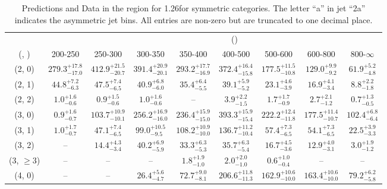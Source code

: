 \begin{table}[h!]
\tiny
\centering
\caption{Predictions and Data in the \mj region for 1.26\ifb for symmetric categories. The letter ``a'' in jet \eg ``2a''  indicates the asymmetric jet bins. All entries are non-zero but are truncated to one decimal place.\label{tab:prednodata_comb_mu_sym}}
\begin{tabular}
{ccccccccc}
	\hline\hline
&	& \multicolumn{8}{c}{\scalht (\gev)} \\ 
	 (\njet,  \nb) & 200-250 & 250-300 & 300-350 & 350-400 & 400-500 & 500-600 & 600-800 & 800-$\infty$ \\ [0.8ex] 
\hline
	(2, 0) & $279.3^{+ 17.8 }_{- 17.0 }$ & $412.9^{+ 21.5 }_{- 20.7 }$ & $391.4^{+ 20.9 }_{- 20.1 }$ & $293.2^{+ 17.7 }_{- 16.9 }$ & $372.4^{+ 16.4 }_{- 15.8 }$ & $177.5^{+ 11.5 }_{- 10.8 }$ & $129.0^{+ 9.9 }_{- 9.2 }$ & $61.9^{+ 5.2 }_{- 4.8 }$ \\[0.5ex] 
	(2, 1) & $44.8^{+ 7.2 }_{- 6.3 }$ & $47.5^{+ 7.4 }_{- 6.5 }$ & $40.9^{+ 6.8 }_{- 6.0 }$ & $35.4^{+ 6.4 }_{- 5.5 }$ & $39.1^{+ 5.9 }_{- 5.2 }$ & $23.1^{+ 4.6 }_{- 3.9 }$ & $16.9^{+ 4.1 }_{- 3.4 }$ & $8.8^{+ 2.2 }_{- 1.8 }$ \\[0.5ex] 
	(2, 2) & $1.0^{+ 1.6 }_{- 0.6 }$ & $0.9^{+ 1.5 }_{- 0.6 }$ & $1.0^{+ 1.6 }_{- 0.6 }$ & -- & $3.9^{+ 2.2 }_{- 1.5 }$ & $1.7^{+ 1.7 }_{- 0.9 }$ & $2.7^{+ 2.1 }_{- 1.2 }$ & $0.7^{+ 1.3 }_{- 0.5 }$ \\[0.5ex] 
	(3, 0) & $0.9^{+ 1.6 }_{- 0.7 }$ & $103.7^{+ 10.9 }_{- 10.1 }$ & $256.2^{+ 16.9 }_{- 16.0 }$ & $236.4^{+ 15.9 }_{- 15.0 }$ & $393.3^{+ 15.9 }_{- 15.4 }$ & $222.2^{+ 12.4 }_{- 11.8 }$ & $177.5^{+ 11.4 }_{- 10.7 }$ & $102.4^{+ 6.8 }_{- 6.4 }$ \\[0.5ex] 
	(3, 1) & $1.0^{+ 1.7 }_{- 0.7 }$ & $47.1^{+ 7.4 }_{- 6.5 }$ & $99.0^{+ 10.5 }_{- 9.5 }$ & $108.2^{+ 10.9 }_{- 10.0 }$ & $136.7^{+ 11.2 }_{- 10.4 }$ & $57.4^{+ 7.3 }_{- 6.5 }$ & $54.1^{+ 7.3 }_{- 6.5 }$ & $22.5^{+ 3.9 }_{- 3.3 }$ \\[0.5ex] 
	(3, 2) & -- & $14.4^{+ 4.3 }_{- 3.4 }$ & $40.2^{+ 6.9 }_{- 5.9 }$ & $33.3^{+ 6.3 }_{- 5.3 }$ & $35.7^{+ 6.3 }_{- 5.4 }$ & $16.7^{+ 4.5 }_{- 3.6 }$ & $12.9^{+ 4.0 }_{- 3.1 }$ & $3.0^{+ 1.9 }_{- 1.2 }$ \\[0.5ex] 
	(3, $\ge3$) & -- & -- & -- & $1.8^{+ 1.9 }_{- 1.0 }$ & $2.0^{+ 2.0 }_{- 1.0 }$ & $0.6^{+ 1.0 }_{- 0.4 }$ & -- & -- \\[0.5ex] 
	(4, 0) & -- & -- & $26.4^{+ 5.6 }_{- 4.7 }$ & $72.7^{+ 9.0 }_{- 8.1 }$ & $206.6^{+ 11.8 }_{- 11.3 }$ & $162.9^{+ 10.6 }_{- 10.0 }$ & $163.4^{+ 10.6 }_{- 10.0 }$ & $79.2^{+ 6.2 }_{- 5.8 }$ \\[0.5ex] 

\end{tabular}
\end{table}
